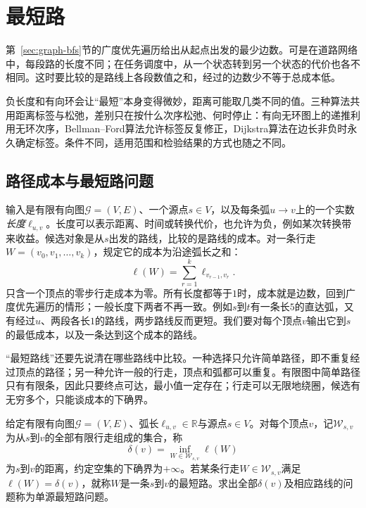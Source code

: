 
\section{最短路}
\label{sec:graph-shortest-paths}

第~\ref{sec:graph-bfs}节的广度优先遍历给出从起点出发的最少边数。可是在道路网络中，每段路的长度不同；在任务调度中，从一个状态转到另一个状态的代价也各不相同。这时要比较的是路线上各段数值之和，经过的边数少不等于总成本低。

负长度和有向环会让“最短”本身变得微妙，距离可能取几类不同的值。三种算法共用距离标签与松弛，差别只在按什么次序松弛、何时停止：有向无环图上的递推利用无环次序，Bellman--Ford算法允许标签反复修正，Dijkstra算法在边长非负时永久确定标签。条件不同，适用范围和检验结果的方式也随之不同。

\subsection{路径成本与最短路问题}
\label{sec:graph-opt-path-cost}

输入是有限有向图$\mathcal G=(V,E)$、一个源点$s\in V$，以及每条弧$u\to v$上的一个实数\emph{长度}$\ell_{u,v}$。长度可以表示距离、时间或转换代价，也允许为负，例如某次转换带来收益。候选对象是从$s$出发的路线，比较的是路线的成本。对一条行走$W=(v_0,v_1,\ldots,v_k)$，规定它的成本为沿途弧长之和：
\[
  \ell(W)=\sum_{r=1}^{k}\ell_{v_{r-1},v_r}.
\]
只含一个顶点的零步行走成本为零。所有长度都等于$1$时，成本就是边数，回到广度优先遍历的情形；一般长度下两者不再一致。例如$s$到$t$有一条长$5$的直达弧，又有经过$u$、两段各长$1$的路线，两步路线反而更短。我们要对每个顶点$v$输出它到$s$的最低成本，以及一条达到这个成本的路线。

“最短路线”还要先说清在哪些路线中比较。一种选择只允许简单路径，即不重复经过顶点的路径；另一种允许一般的行走，顶点和弧都可以重复。有限图中简单路径只有有限条，因此只要终点可达，最小值一定存在；行走可以无限地绕圈，候选有无穷多个，只能谈成本的下确界。

\begin{definition}[最短路问题]
\label{def:graph-opt-shortest-path}
给定有限有向图$\mathcal G=(V,E)$、弧长$\ell_{u,v}\in\mathbb R$与源点$s\in V$。对每个顶点$v$，记$\mathcal W_{s,v}$为从$s$到$v$的全部有限行走组成的集合，称
\[
  \delta(v)=\inf_{W\in\mathcal W_{s,v}}\ell(W)
\]
为$s$到$v$的距离，约定空集的下确界为$+\infty$。若某条行走$W\in\mathcal W_{s,v}$满足$\ell(W)=\delta(v)$，就称$W$是一条$s$到$v$的最短路。求出全部$\delta(v)$及相应路线的问题称为单源最短路问题。
\end{definition}

